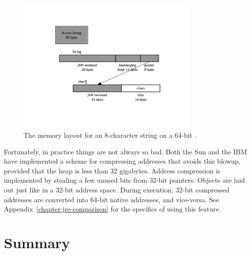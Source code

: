  \begin{figure}
  \centering

 \includegraphics[width=0.8\textwidth]{part1/Figures/modelingdatatypes/8-char-string-64-bit.pdf}
  \caption{The memory layout for an 8-character string on a 64-bit \jre.}
  \label{fig:8-char-string-64-bit}
\end{figure}

Fortunately, in practice things are not always so bad. Both the Sun and the
IBM \jres have implemented a scheme for compressing addresses that avoids this blowup, provided that the heap is
less than 32 gigabytes. Address compression is implemented by stealing a few unused bits from 32-bit pointers.
Objects are laid out just like in a 32-bit
address space. During execution, 32-bit compressed addresses are converted into
64-bit native addresses, and vice-versa.  See Appendix~\ref{chapter:jre-comparison} for the
specifics of using this feature.


\section{Summary}

